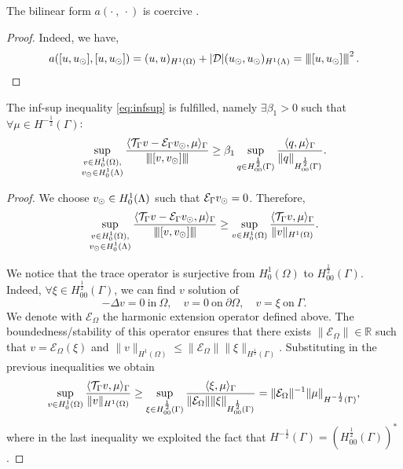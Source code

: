 \begin{lemma}\label{lemma:prob1_coercivity}
The bilinear form $a(\cdot \ , \ \cdot)$ is coercive .
\end{lemma}
\begin{proof}
 Indeed, we have,
\begin{equation*}
a([u,\ud], [u,\ud])= (u,u)_{H^1(\Omega)} + |{\cal D}|(\ud,\ud)_{H^1(\Lambda)} = \vertiii{[u,\ud]}^2\,.
\end{equation*}
\end{proof}
\begin{lemma}
The inf-sup inequality \eqref{eq:infsup} is fulfilled, namely $\exists \beta_1 >0$ such that $\forall \mu \in H^{-\frac 12}(\Gamma)$:
\begin{equation*}
\sup _{\substack{v\in H^1_0(\Omega),\\ v_{\odot} \in H^1_0(\Lambda)}} \frac{ \langle {\mathcal{T}_\Gamma} v  - \mathcal{E}_\Gamma v_{\odot}, \mu \rangle_\Gamma}{{\left\vert\kern-0.25ex\left\vert\kern-0.25ex\left\vert [v, v_{\odot}] \right\vert\kern-0.25ex\right\vert\kern-0.25ex\right\vert}}
\geq \beta_1 \sup_{q\in H^{\frac 12}_{00}(\Gamma)}\frac{\langle q, \mu\rangle_{\Gamma}}{\|q\|_{H^{\frac 12}_{00}(\Gamma)}}.
\end{equation*}
\end{lemma} 
\begin{proof}
We choose $v_{\odot} \in H^1_0(\Lambda)$ such that $\mathcal{E}_\Gamma v_{\odot} =0$. Therefore,
\begin{equation*}
\sup _{\substack{v\in H^1_0(\Omega),\\ v_{\odot} \in H^1_0(\Lambda)}} \frac{ \langle {\mathcal{T}_\Gamma} v  - \mathcal{E}_\Gamma v_{\odot}, \mu\rangle_\Gamma}{{\left\vert\kern-0.25ex\left\vert\kern-0.25ex\left\vert [v, v_{\odot}] \right\vert\kern-0.25ex\right\vert\kern-0.25ex\right\vert}} 
\geq \sup _{v\in H^1_0(\Omega)} \frac{ \langle {\mathcal{T}_\Gamma} v, \mu \rangle_\Gamma}{\|v\|_{H^1(\Omega)}}.
\end{equation*}

We notice that the trace operator is surjective from $H^1_0(\Omega)$ to $H^{\frac12}_{00}(\Gamma)$. Indeed, $\forall \xi \in H^{\frac 12}_{00}(\Gamma)$, 
we  can find $v$ solution of
\begin{equation*}
-\Delta v=0 \ \text{in} \ \Omega,
\quad
v=0 \ \text{on} \ \partial \Omega,
\quad
v=\xi \ \text{on} \ \Gamma. 
\end{equation*}
We denote with $\mathcal{E}_\Omega$ the harmonic extension operator defined above.
The boundedness/stability of this operator ensures that there exists $\| \mathcal{E}_\Omega \| \in \mathbb{R}$ such that
$v=\mathcal{E}_\Omega(\xi) $ and $\|v \|_{H^1(\Omega)}\leq \|\mathcal{E}_\Omega\| \|\xi \|_{H^{\frac 12}(\Gamma)}$. 
Substituting in the previous inequalities we obtain
\begin{equation}\label{infsup_traceop}
\sup _{v\in H^1_0(\Omega)} \frac{ \langle \trace v, \mu \rangle_\Gamma}{\|v\|_{H^1(\Omega)}}
\geq  \sup _{\xi \in H^{\frac 12}_{00}(\Gamma )} \frac{ \langle \xi , \mu \rangle_\Gamma}{\|\mathcal{E}_\Omega\| \|\xi\|_{H^{\frac 12}_{00}(\Gamma)}}
= \|\mathcal{E}_\Omega\|^{-1} \|\mu\|_{H^{-\frac 12}(\Gamma)},
\end{equation}
where in the last inequality we exploited the fact that $H^{-\frac 12}(\Gamma)=(H^{\frac 12 }_{00}(\Gamma))^*$. 
\end{proof}



